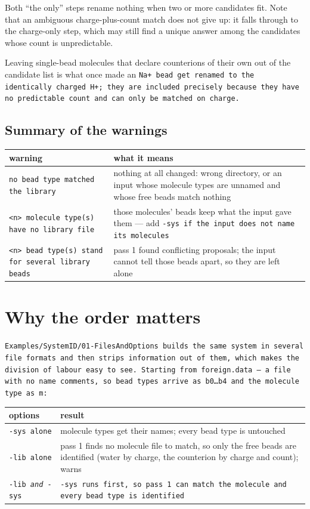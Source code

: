 \noindent
Both \enquote{the only} steps rename nothing when two or more candidates fit.
Note that an ambiguous charge-plus-count match does not give up: it falls
through to the charge-only step, which may still find a unique answer among the
candidates whose count is unpredictable.

Leaving single-bead molecules that declare counterions of their own out of the
candidate list is what once made an \tt{Na+} bead get renamed to the
identically charged \tt{H+}; they are included precisely because they have no
predictable count and can only be matched on charge.

\subsection{Summary of the warnings}\label{ssec:LibWarnings}

\begin{longtable}{>{\raggedright\arraybackslash}p{}p{}}
  \toprule
  warning & what it means \\
  \midrule
  \tt{no bead type matched the library} & nothing at all changed: wrong
    directory, or an input whose molecule types are unnamed and whose free
    beads match nothing \\
  \tt{<n> molecule type(s) have no library file} & those molecules' beads keep
    what the input gave them --- add \tt{-sys} if the input does not name its
    molecules \\
  \tt{<n> bead type(s) stand for several library beads} & pass 1 found
    conflicting proposals; the input cannot tell those beads apart, so they are
    left alone \\
  \bottomrule
\end{longtable}

\section{Why the order matters}\label{sec:LibSysOrder2}

\tt{Examples/SystemID/01-FilesAndOptions} builds the same system in several
file formats and then strips information out of them, which makes the division
of labour easy to see. Starting from \tt{foreign.data} --- a \data file with no
name comments, so bead types arrive as \tt{b0}\ldots\tt{b4} and the molecule
type as \tt{m}:

\begin{longtable}{p{}p{}}
  \toprule
  options & result \\
  \midrule
  \tt{-sys} alone & molecule types get their names; every bead type is
    untouched \\
  \tt{-lib} alone & pass 1 finds no molecule file to match, so only the free
    beads are identified (water by charge, the counterion by charge and count);
    warns \\
  \tt{-lib} \emph{and} \tt{-sys} & \tt{-sys} runs first, so pass 1 can match
    the molecule and every bead type is identified \\
  \bottomrule
\end{longtable}

